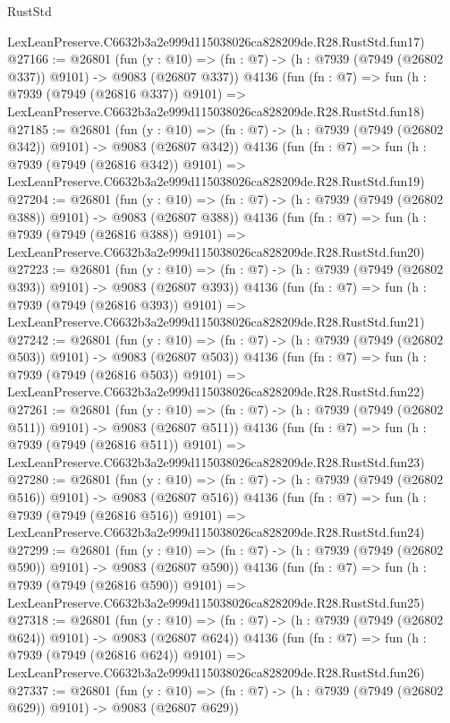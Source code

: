 \begin{lexlean}{RustStd}
\begin{coremodule}
    LexLeanPreserve.C6632b3a2e999d115038026ca828209de.R28.RustStd.fun17)
@27166 := @26801
    (fun (y : @10) => (fn : @7) -> (h : @7939 (@7949 (@26802 @337)) @9101) -> @9083 (@26807 @337))
    @4136
    (fun (fn : @7) =>
    fun (h : @7939 (@7949 (@26816 @337)) @9101) =>
    LexLeanPreserve.C6632b3a2e999d115038026ca828209de.R28.RustStd.fun18)
@27185 := @26801
    (fun (y : @10) => (fn : @7) -> (h : @7939 (@7949 (@26802 @342)) @9101) -> @9083 (@26807 @342))
    @4136
    (fun (fn : @7) =>
    fun (h : @7939 (@7949 (@26816 @342)) @9101) =>
    LexLeanPreserve.C6632b3a2e999d115038026ca828209de.R28.RustStd.fun19)
@27204 := @26801
    (fun (y : @10) => (fn : @7) -> (h : @7939 (@7949 (@26802 @388)) @9101) -> @9083 (@26807 @388))
    @4136
    (fun (fn : @7) =>
    fun (h : @7939 (@7949 (@26816 @388)) @9101) =>
    LexLeanPreserve.C6632b3a2e999d115038026ca828209de.R28.RustStd.fun20)
@27223 := @26801
    (fun (y : @10) => (fn : @7) -> (h : @7939 (@7949 (@26802 @393)) @9101) -> @9083 (@26807 @393))
    @4136
    (fun (fn : @7) =>
    fun (h : @7939 (@7949 (@26816 @393)) @9101) =>
    LexLeanPreserve.C6632b3a2e999d115038026ca828209de.R28.RustStd.fun21)
@27242 := @26801
    (fun (y : @10) => (fn : @7) -> (h : @7939 (@7949 (@26802 @503)) @9101) -> @9083 (@26807 @503))
    @4136
    (fun (fn : @7) =>
    fun (h : @7939 (@7949 (@26816 @503)) @9101) =>
    LexLeanPreserve.C6632b3a2e999d115038026ca828209de.R28.RustStd.fun22)
@27261 := @26801
    (fun (y : @10) => (fn : @7) -> (h : @7939 (@7949 (@26802 @511)) @9101) -> @9083 (@26807 @511))
    @4136
    (fun (fn : @7) =>
    fun (h : @7939 (@7949 (@26816 @511)) @9101) =>
    LexLeanPreserve.C6632b3a2e999d115038026ca828209de.R28.RustStd.fun23)
@27280 := @26801
    (fun (y : @10) => (fn : @7) -> (h : @7939 (@7949 (@26802 @516)) @9101) -> @9083 (@26807 @516))
    @4136
    (fun (fn : @7) =>
    fun (h : @7939 (@7949 (@26816 @516)) @9101) =>
    LexLeanPreserve.C6632b3a2e999d115038026ca828209de.R28.RustStd.fun24)
@27299 := @26801
    (fun (y : @10) => (fn : @7) -> (h : @7939 (@7949 (@26802 @590)) @9101) -> @9083 (@26807 @590))
    @4136
    (fun (fn : @7) =>
    fun (h : @7939 (@7949 (@26816 @590)) @9101) =>
    LexLeanPreserve.C6632b3a2e999d115038026ca828209de.R28.RustStd.fun25)
@27318 := @26801
    (fun (y : @10) => (fn : @7) -> (h : @7939 (@7949 (@26802 @624)) @9101) -> @9083 (@26807 @624))
    @4136
    (fun (fn : @7) =>
    fun (h : @7939 (@7949 (@26816 @624)) @9101) =>
    LexLeanPreserve.C6632b3a2e999d115038026ca828209de.R28.RustStd.fun26)
@27337 := @26801
    (fun (y : @10) => (fn : @7) -> (h : @7939 (@7949 (@26802 @629)) @9101) -> @9083 (@26807 @629))

\end{coremodule}
\end{lexlean}
